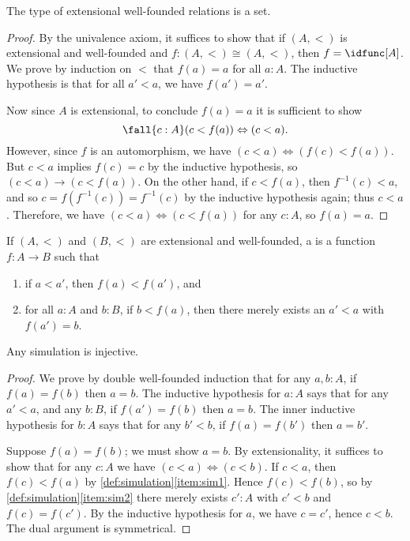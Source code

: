 \begin{thm}
  The type of extensional well-founded relations is a set.
\end{thm}
\begin{proof}
  By the univalence axiom, it suffices to show that if $(A,<)$ is extensional and well-founded and $f:(A,<) \cong (A,<)$, then $f=\idfunc[A]$.
  We prove by induction on $<$ that $f(a)=a$ for all $a:A$.
  The inductive hypothesis is that for all $a'<a$, we have $f(a')=a'$.

  Now since $A$ is extensional, to conclude $f(a)=a$ it is sufficient to show
  \[\fall{c:A}(c<f(a)) \Leftrightarrow (c<a).\]
  However, since $f$ is an automorphism, we have $(c<a) \Leftrightarrow (f(c)<f(a))$.
  But $c<a$ implies $f(c)=c$ by the inductive hypothesis, so $(c<a) \to (c<f(a))$.
  On the other hand, if $c<f(a)$, then $f^{-1}(c)<a$, and so $c = f(f^{-1}(c)) = f^{-1}(c)$ by the inductive hypothesis again; thus $c<a$.
  Therefore, we have $(c<a) \Leftrightarrow (c<f(a))$ for any $c:A$, so $f(a)=a$.
\end{proof}

\begin{defn}\label{def:simulation}
  If $(A,<)$ and $(B,<)$ are extensional and well-founded, a 
  is a function $f:A\to B$ such that
  \begin{enumerate}
  \item if $a<a'$, then $f(a)<f(a')$, and\label{item:sim1}
  \item for all $a:A$ and $b:B$, if $b<f(a)$, then there merely exists an $a'<a$ with $f(a')=b$.\label{item:sim2}
  \end{enumerate}
\end{defn}

\begin{lem}
  Any simulation is injective.
\end{lem}
\begin{proof}
  We prove by double well-founded induction that for any $a,b:A$, if $f(a)=f(b)$ then $a=b$.
  The inductive hypothesis for $a:A$ says that for any $a'<a$, and any $b:B$, if $f(a')=f(b)$ then $a=b$.
  The inner inductive hypothesis for $b:A$ says that for any $b'<b$, if $f(a)=f(b')$ then $a=b'$.

  Suppose $f(a)=f(b)$; we must show $a=b$.
  By extensionality, it suffices to show that for any $c:A$ we have $(c<a)\Leftrightarrow (c<b)$.
  If $c<a$, then $f(c)<f(a)$ by \cref{def:simulation}\ref{item:sim1}.
  Hence $f(c)<f(b)$, so by \cref{def:simulation}\ref{item:sim2} there merely exists $c':A$ with $c'<b$ and $f(c)=f(c')$.
  By the inductive hypothesis for $a$, we have $c=c'$, hence $c<b$.
  The dual argument is symmetrical.
\end{proof}

